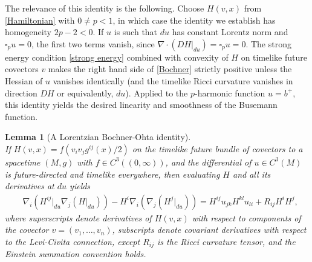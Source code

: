 \documentclass[12pt]{amsart}
\renewcommand{\d}{{d}}
\newtheorem{lemma}[theorem]{Lemma}
\begin{document}
The relevance of this identity is the following. Choose $H(v,x)$ from \eqref{Hamiltonian}
with $0\neq p<1$, in which case the identity we establish has homogeneity $2p-2<0$.
If  $u$ is such that $du$ has constant Lorentz norm and $\square_p u = 0$, the first two terms vanish, since $\nabla \cdot (  DH|_{du})=\square_p u=0$.
The strong energy condition \eqref{strong energy} 
combined with convexity of $H$ on timelike future covectors $v$ makes the right hand side of \eqref{Bochner} strictly positive unless the Hessian of $u$ vanishes identically (and the timelike Ricci curvature vanishes in direction $DH$ or equivalently, $\d u$).  
Applied to the $p$-harmonic function $u=b^+$,  this identity yields the desired linearity and smoothness of the Busemann function.


\begin{lemma}[A Lorentzian Bochner-Ohta identity] \label{L:Bochner-Ohta}\ \\
If $H(v,x) = f(v_iv_j g^{ij}(x)/2)$
on the timelike future bundle of covectors to a spacetime $(M,g)$ with $f \in C^{3}((0,\infty))$, 
and the differential of $u \in C^3(M)$ is future-directed and timelike everywhere,  then evaluating $H$ and all its derivatives at 
$du$ 
yields 
\begin{align}
\label{Bochner2} & 
\nabla_i (H^{ij}|_{\d u} \nabla_j (H|_{\d u})) - H^i \nabla_i (\nabla_j (H^j |_{\d u})) 
=H^{ij}u_{jk} H^{kl}u_{li} + R_{ij}H^iH^j, 
\end{align}
where superscripts denote derivatives of $H(v,x)$ with respect to components of the covector $v=(v_1,\ldots,v_n)$,
subscripts denote covariant derivatives with respect to the Levi-Civita connection, except $R_{ij}$ is the Ricci curvature tensor,
and the Einstein summation convention holds. %
\end{lemma}
\end{document}
